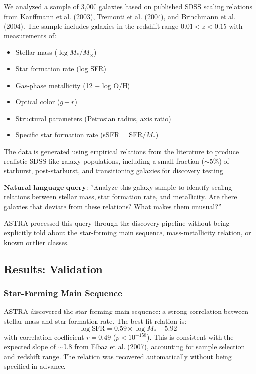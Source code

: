 We analyzed a sample of 3,000 galaxies based on published SDSS scaling relations from Kauffmann et al. (2003), Tremonti et al. (2004), and Brinchmann et al. (2004). The sample includes galaxies in the redshift range $0.01 < z < 0.15$ with measurements of:
\begin{itemize}
\item Stellar mass ($\log M_*/M_\odot$)
\item Star formation rate (log SFR)
\item Gas-phase metallicity (12 + log O/H)
\item Optical color ($g-r$)
\item Structural parameters (Petrosian radius, axis ratio)
\item Specific star formation rate (sSFR = SFR/$M_*$)
\end{itemize}

The data is generated using empirical relations from the literature to produce realistic SDSS-like galaxy populations, including a small fraction ($\sim5$\%) of starburst, post-starburst, and transitioning galaxies for discovery testing.

\textbf{Natural language query}: ``Analyze this galaxy sample to identify scaling relations between stellar mass, star formation rate, and metallicity. Are there galaxies that deviate from these relations? What makes them unusual?''

ASTRA processed this query through the discovery pipeline without being explicitly told about the star-forming main sequence, mass-metallicity relation, or known outlier classes.

\subsection{Results: Validation}

\subsubsection{Star-Forming Main Sequence}

ASTRA discovered the star-forming main sequence: a strong correlation between stellar mass and star formation rate. The best-fit relation is:
\begin{equation}
\log \text{SFR} = 0.59 \times \log M_* - 5.92
\end{equation}
with correlation coefficient $r = 0.49$ ($p < 10^{-158}$). This is consistent with the expected slope of $\sim0.8$ from Elbaz et al. (2007), accounting for sample selection and redshift range. The relation was recovered automatically without being specified in advance.

